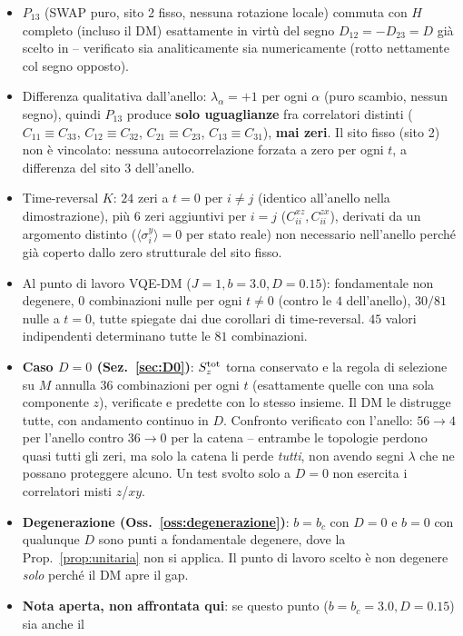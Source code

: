 \documentclass[11pt,a4paper]{article}
\begin{document}
\begin{itemize}
\item $P_{13}$ (SWAP puro, sito 2 fisso, nessuna rotazione locale) commuta con $H$ completo
(incluso il DM) esattamente in virtù del segno $D_{12}=-D_{23}=D$ già scelto in
\texttt{} -- verificato sia analiticamente sia numericamente
(rotto nettamente col segno opposto).
\item Differenza qualitativa dall'anello: $\lambda_\alpha=+1$ per ogni $\alpha$ (puro scambio,
nessun segno), quindi $P_{13}$ produce \textbf{solo uguaglianze} fra correlatori distinti
($C_{11}\equiv C_{33}$, $C_{12}\equiv C_{32}$, $C_{21}\equiv C_{23}$, $C_{13}\equiv C_{31}$),
\textbf{mai zeri}. Il sito fisso (sito 2) non è vincolato: nessuna autocorrelazione forzata a
zero per ogni $t$, a differenza del sito 3 dell'anello.
\item Time-reversal $K$: $24$ zeri a $t=0$ per $i\neq j$ (identico all'anello nella
dimostrazione), più $6$ zeri aggiuntivi per $i=j$ ($C_{ii}^{xz},C_{ii}^{zx}$), derivati da un
argomento distinto ($\langle\sigma_i^y\rangle=0$ per stato reale) non necessario nell'anello
perché già coperto dallo zero strutturale del sito fisso.
\item Al punto di lavoro VQE-DM ($J{=}1,b{=}3.0,D{=}0.15$): fondamentale non degenere, $0$
combinazioni nulle per ogni $t\neq0$ (contro le $4$ dell'anello), $30/81$ nulle a $t=0$, tutte
spiegate dai due corollari di time-reversal. $45$ valori indipendenti determinano tutte le $81$
combinazioni.
\item \textbf{Caso $D=0$ (Sez.~\ref{sec:D0})}: $S_z^{\rm tot}$ torna conservato e la regola di
selezione su $M$ annulla $36$ combinazioni per ogni $t$ (esattamente quelle con una sola
componente $z$), verificate e predette con lo stesso insieme. Il DM le distrugge tutte, con
andamento continuo in $D$. Confronto verificato con l'anello: $56\to4$ per l'anello contro
$36\to0$ per la catena -- entrambe le topologie perdono quasi tutti gli zeri, ma solo la catena
li perde \emph{tutti}, non avendo segni $\lambda$ che ne possano proteggere alcuno. Un test
svolto solo a $D=0$ non esercita i correlatori misti $z$/$xy$.
\item \textbf{Degenerazione (Oss.~\ref{oss:degenerazione})}: $b=b_c$ con $D=0$ e $b=0$ con
qualunque $D$ sono punti a fondamentale degenere, dove la Prop.~\ref{prop:unitaria} non si
applica. Il punto di lavoro scelto è non degenere \emph{solo} perché il DM apre il gap.
\item \textbf{Nota aperta, non affrontata qui}: se questo punto ($b=b_c=3.0,D=0.15$) sia anche il

\end{itemize}
\end{document}
